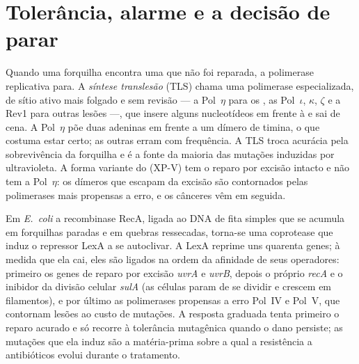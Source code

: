 \section{Tolerância, alarme e a decisão de parar}

\begin{definition}\label{def:b3:dna-repair:tls}
Quando uma forquilha encontra uma  que não foi reparada, a
polimerase replicativa para. A \emph{síntese translesão} (TLS) chama
uma polimerase especializada, de sítio ativo mais folgado e sem
revisão --- a Pol~$\eta$ para os , as
Pol~$\iota$, $\kappa$, $\zeta$ e a Rev1 para outras lesões ---, que
insere alguns nucleotídeos em frente à  e sai de cena. A
Pol~$\eta$ põe duas adeninas em frente a um dímero de timina, o que
costuma estar certo; as outras erram com frequência. A TLS troca
acurácia pela sobrevivência da forquilha e é a fonte da maioria das
mutações induzidas por ultravioleta. A forma variante do  (XP-V) tem o reparo por excisão intacto e não tem a
Pol~$\eta$: os dímeros que escapam da excisão são contornados pelas
polimerases mais propensas a erro, e os cânceres vêm em seguida.
\end{definition}

\begin{proposition}\label{prop:b3:dna-repair:sos}
Em \emph{E.~coli} a recombinase RecA, ligada ao DNA de fita simples
que se acumula em forquilhas paradas e em quebras ressecadas, torna-se
uma coprotease que induz o repressor LexA a se autoclivar. A LexA
reprime uns quarenta genes; à medida que ela cai, eles são ligados na
ordem da afinidade de seus operadores: primeiro os genes de reparo por
excisão \emph{uvrA} e \emph{uvrB}, depois o próprio \emph{recA} e o
inibidor da divisão celular \emph{sulA} (as células param de se
dividir e crescem em filamentos), e por último as polimerases
propensas a erro Pol~IV e Pol~V, que contornam lesões ao custo de
mutações. A resposta graduada tenta primeiro o reparo acurado e só
recorre à tolerância mutagênica quando o dano persiste; as mutações
que ela induz são a matéria-prima sobre a qual a resistência a
antibióticos evolui durante o tratamento.
\end{proposition}


